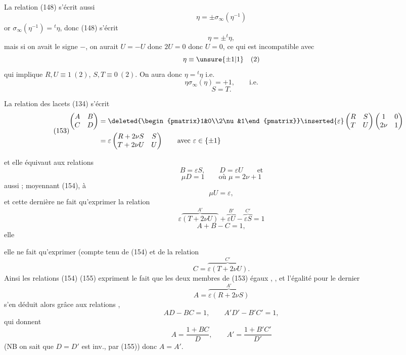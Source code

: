La relation (148) s'écrit aussi
\[
\eta=\pm\sigma_\infty(\eta^{-1})
\]
or $\sigma_\infty(\eta^{-1})={}^t\eta$, donc (148) s'écrit
\[
\eta=\pm{}^t\eta,
\]
mais si on avait le signe $-$, on aurait $U=-U$ donc $2U=0$ donc $U=0$, ce qui est incompatible avec
\[
\eta\equiv\unsure{\pm1|1}\quad(2)
\]
qui implique $R,U\equiv1\ (2)$, $S,T\equiv0\ (2)$. On aura donc $\eta={}^t\eta$ i.e.
\[
\tag{151}
\eta\sigma_\infty(\eta)=+1,\qquad\text{i.e.}
\]
\[
\tag{152}
S=T.
\]

La relation des lacets (134) s'écrit
\[
\tag{153}
\begin{aligned}
\begin{pmatrix}A&B\\C&D\end{pmatrix}
&=\deleted{\begin{pmatrix}1&0\\2\nu&1\end{pmatrix}}
\inserted{\varepsilon}\begin{pmatrix}R&S\\T&U\end{pmatrix}
\begin{pmatrix}1&0\\2\nu&1\end{pmatrix}\\
&=\varepsilon\begin{pmatrix}R+2\nu S&S\\T+2\nu U&U\end{pmatrix}
\qquad\text{avec }\varepsilon\in\{\pm1\}
\end{aligned}
\]


et elle équivaut aux relations
\[
\tag{154}
B=\varepsilon S,\qquad D=\varepsilon U\qquad\text{et}
\]
\[
\tag{155}
\mu D=1\qquad\text{où }\mu=2\nu+1
\]
 aussi ; moyennant (154), à
\[
\tag{155bis}
\mu U=\varepsilon,
\]
et cette dernière ne fait qu'exprimer  la relation
\[
\varepsilon\overbrace{(T+2\nu U)}^{A'}
+\overbrace{\varepsilon U}^{B'}-\overbrace{\varepsilon S}^{C'}=1
\]
\[
A+B-C=1,
\]
elle


elle ne fait qu'exprimer (compte tenu de (154) et de  la relation
\[
C=\overbrace{\varepsilon(T+2\nu U)}^{C'}.
\]
Ainsi les relations (154) (155) expriment le fait que les deux membres de (153)   égaux  , , et l'égalité pour le dernier
\[
A=\overbrace{\varepsilon(R+2\nu S)}^{A'}
\]
s'en déduit alors grâce aux relations , 
\[
AD-BC=1,\qquad A'D'-B'C'=1,
\]
qui donnent
\[
A=\frac{1+BC}{D},\qquad A'=\frac{1+B'C'}{D'}
\]
(NB on sait que $D=D'$ est inv., par (155)) donc $A=A'$.

